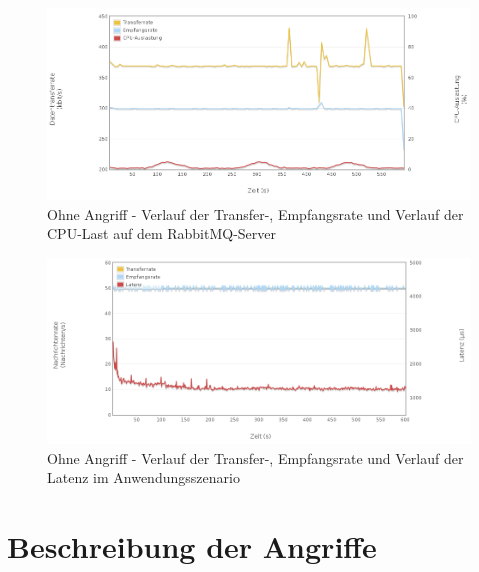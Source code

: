 \documentclass[	a4paper,
			11pt,
			titlepage,
			oneside,
			fleqn,
			listof=totoc,
			parskip,
			numbers=noenddot]{scrartcl}
\begin{document}
		\begin{figure}[!htb]
			\centering
			\includegraphics[width=\textwidth]{img/std/std_server2.png}
			\caption{Ohne Angriff - Verlauf der Transfer-, Empfangsrate und Verlauf der CPU-Last auf dem RabbitMQ-Server}
			\label{fig:std-server2}
		\end{figure}
		
		\begin{figure}[!htb]
			\centering
			\includegraphics[width=\textwidth]{img/std/std_scenario.png}
			\caption{Ohne Angriff - Verlauf der Transfer-, Empfangsrate und Verlauf der Latenz im Anwendungsszenario}
			\label{fig:std-scenario}
		\end{figure}
	


%	
%
\clearpage
\section*{Beschreibung der Angriffe}
\end{document}
